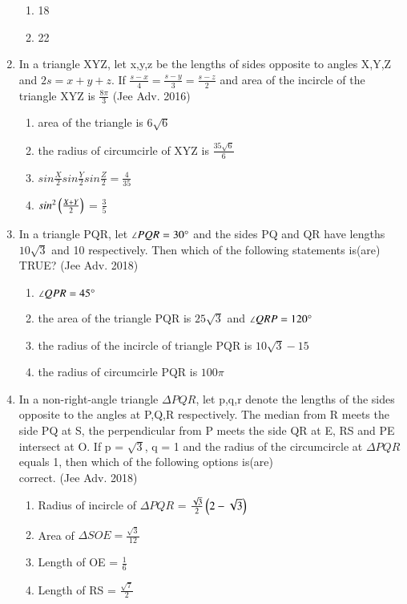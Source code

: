 \documentclass[journal,12pt,twocolumn]{IEEEtran}
\theoremstyle{remark}
\begin{document}
\begin{enumerate}[label=\arabic*.]
\begin{enumerate}[label=(\alph*)]
    \item 18
    \item 22
    \end{enumerate}
    \item In a triangle XYZ, let x,y,z be the lengths of sides opposite to angles X,Y,Z and $2s = x+y+z$. If ${\frac{s-x}{4}}={\frac{s-y}{3}}={\frac{s-z}{2}}$ and area of the incircle of the triangle XYZ is ${\frac{8\pi}{3}}$
    \hfill{(Jee Adv. 2016)}
    \begin{enumerate}[label=(\alph*)]
    \item area of the triangle is 6$\sqrt{6}$
    \item the radius of circumcirle of XYZ is ${\frac{35\sqrt{6}}{6}}$
    \item $sin\frac{X}{2}sin\frac{Y}{2}sin\frac{Z}{2} = \frac{4}{35}$
    \item $sin^{2}\left(\frac{X+Y}{2}\right)$ = $\frac{3}{5}$
    \end{enumerate}
    \item In a triangle PQR, let $\angle PQR = 30\degree$ and the sides PQ and QR have lengths $10\sqrt{3}$ and 10 respectively. Then which of the following statements is(are) TRUE?
    \hfill{(Jee Adv. 2018)}
    \begin{enumerate}[label=(\alph*)]
    \item $\angle QPR = 45\degree$
    \item the area of the triangle PQR is $25\sqrt{3}$ and $\angle QRP = 120\degree$
    \item the radius of the incircle of triangle PQR is $10\sqrt{3}-15$
    \item the radius of circumcirle PQR is $100\pi$
    \end{enumerate}
    \item In a non-right-angle triangle $\Delta PQR$, let p,q,r denote the lengths of the sides opposite to the angles at P,Q,R respectively. The median from R meets the side PQ at S, the perpendicular from P meets the side QR at E, RS and PE
    intersect at O. If p = $\sqrt{3}$, q = 1 and the radius of the circumcircle at $\Delta PQR$ equals 1, then which of the following options is(are)\\ correct.
    \hfill{(Jee Adv. 2018)}
    \begin{enumerate}[label=(\alph*)]
    \item Radius of incircle of $\Delta PQR$ = $\frac{\sqrt{3}}{2}\left(2-\sqrt{3}\right)$
    \item Area of $\Delta SOE = \frac{\sqrt{3}}{12}$
    \item Length of OE = $\frac{1}{6}$
    \item Length of RS = $\frac{\sqrt{7}}{2}$
    \end{enumerate}

\end{enumerate}
\end{document}
